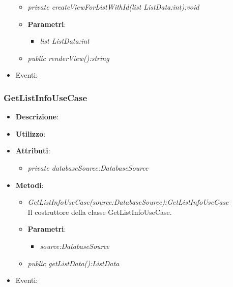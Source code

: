 \begin{itemize}
\begin{itemize}
	\item \textit{private createViewForListWithId(list ListData:int):void}\\

			\item{\textbf{Parametri}: \begin{itemize}
			\item \textit{list ListData:int}\\

			\end{itemize}}
	\item \textit{public renderView():string}\\

	\end{itemize} 
\item{Eventi}:
\end{itemize}

\subsubsection{GetListInfoUseCase}
\begin{itemize}
\item \textbf{Descrizione}: 
\item \textbf{Utilizzo}:
\item \textbf{Attributi}: 
	\begin{itemize}
	\item \textit{private databaseSource:DatabaseSource}\\
	
	\end{itemize}
\item \textbf{Metodi}:
	\begin{itemize}
	\item \textit{GetListInfoUseCase(source:DatabaseSource):GetListInfoUseCase}\\
	Il costruttore della classe GetListInfoUseCase.
			\item{\textbf{Parametri}: \begin{itemize}
			\item \textit{source:DatabaseSource}\\

			\end{itemize}}
	\item \textit{public getListData():ListData}\\
	
	\end{itemize}
\item{Eventi}:
\end{itemize}

